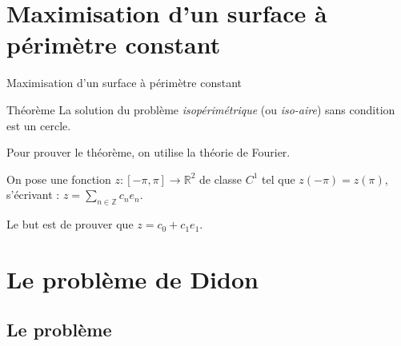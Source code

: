 \documentclass[11pt,envcountsect,aspectratio=169]{beamer} %
\newcommand{\R}{\mathbb{R}}
\newcommand{\Z}{\mathbb{Z}}
\begin{document}
\section{Maximisation d'un surface à périmètre constant}



\begin{frame}{Maximisation d'un surface à périmètre constant}

\begin{beamerboxesrounded}[upper=titreB,lower=texteB,shadow=true]{Théorème}
        La solution du problème \emph{isopérimétrique} (ou \emph{iso-aire}) sans condition est un cercle.
\end{beamerboxesrounded}

Pour prouver le théorème, on utilise la théorie de Fourier.

On pose une fonction $z: [-\pi,\pi] \rightarrow \R^2$ de classe $C^1$ tel que $z(-\pi)=z(\pi)$, s'écrivant : $z = \sum_{n \in \Z}{c_n e_n}$.

Le but est de prouver que $z = c_0 + c_1 e_1$.

\end{frame}








\section{Le problème de Didon}


\subsection{Le problème}
\end{document}
